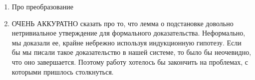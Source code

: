 \begin{enumerate}
  \item Про преобразование
  \item ОЧЕНЬ АККУРАТНО сказать про то, что лемма о подстановке довольно нетривиальное утверждение для формального доказательства. Неформально, мы доказали ее, крайне небрежно используя индукционную гипотезу. Если бы мы писали такое доказательство в нашей системе, то было бы неочевидно, что оно завершается. Поэтому работу хотелось бы закончить на проблемах, с которыми пришлось столкнуться.
\end{enumerate}
